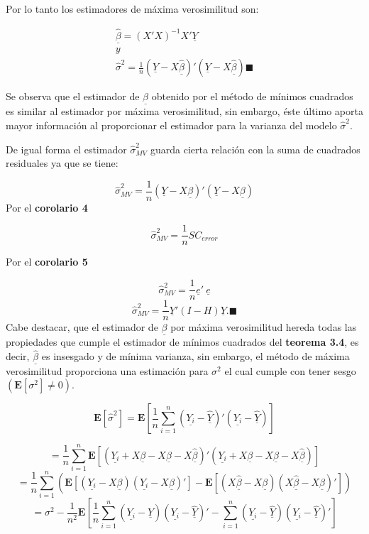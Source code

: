\documentclass[
  a4paper,
  oneside,
  openany]{book}
\begin{document}
Por lo tanto los estimadores de máxima verosimilitud son:

\[
\begin{array}{c}
\underline{\hat{\beta}}=(X'X)^{-1}X'\underline{Y} \\
y \\
\hat{\sigma}^2=\frac{1}{n}\left( \underline{Y}-X\underline{\hat{\beta}}\right)'\left(\underline{Y}-X \underline{\hat{\beta}}\right) \blacksquare
\end{array}
\]

Se observa que el estimador de \(\underline{\beta}\) obtenido por el método de mínimos cuadrados es similar al estimador por máxima verosimilitud, sin embargo, éste último aporta mayor información al proporcionar el estimador para la varianza del modelo \(\hat{\sigma}^2.\)

De igual forma el estimador \(\hat{\sigma}^2_{MV}\) guarda cierta relación con la suma de cuadrados residuales ya que se tiene:

\[\hat{\sigma}^2_{MV}=\frac{1}{n}(\underline{Y}-X\underline{\beta})'(\underline{Y}-X\underline{\beta})\]
Por el \textbf{corolario 4}

\[\hat{\sigma}^2_{MV}=\frac{1}{n}SC_{error}\]

Por el \textbf{corolario 5}

\[\hat{\sigma}^2_{MV}=\frac{1}{n}\underline{e}' \ \underline{e}\]
\[\hat{\sigma}^2_{MV}=\frac{1}{n}\underline{Y}'(I-H)\underline{Y}. \blacksquare \]
Cabe destacar, que el estimador de \(\underline{\beta}\) por máxima verosimilitud hereda todas las propiedades que cumple el estimador de mínimos cuadrados del \textbf{teorema 3.4}, es decir, \(\underline{\hat{\beta}}\) es insesgado y de mínima varianza, sin embargo, el método de máxima verosimilitud proporciona una estimación para \(\sigma^2\) el cual cumple con tener sesgo \((\mathbf{E}[\sigma^2]\neq 0).\)

\[\mathbf{E}[\hat{\sigma}^2]=\mathbf{E}\left[\frac{1}{n}\sum_{i=1}^{n}(\underline{Y_{i}}-\underline{\hat{Y}})'(\underline{Y_{i}}-\underline{\hat{Y}}) \right]\]

\[=\frac{1}{n}\sum_{i=1}^{n}\mathbf{E}\left[(\underline{Y_{i}}+X\underline{\beta}-X\underline{\beta}-X\underline{\hat{\beta}})'(\underline{Y_{i}}+X\underline{\beta}-X\underline{\beta}-X\underline{\hat{\beta}}) \right]\]
\[=\frac{1}{n}\sum_{i=1}^{n}\left(\mathbf{E}[(\underline{Y_{i}}-X\underline{\beta})(\underline{Y_{i}}-X\underline{\beta})']-\mathbf{E}\left[(X\underline{\hat{\beta}}-X\underline{\beta})(X\underline{\hat{\beta}}-X\underline{\beta})'\right] \right)\]
\[=\sigma^2-\frac{1}{n^2}\mathbf{E}\left[\frac{1}{n}\sum_{i=1}^{n}(\underline{Y_{i}}-\underline{\hat{Y}})(\underline{Y_{i}}-\underline{\hat{Y}})'-\sum_{i=1}^{n}(\underline{Y_{i}}-\underline{\hat{Y}})(\underline{Y_{i}}-\underline{\hat{Y}})'\right]\]
\end{document}
